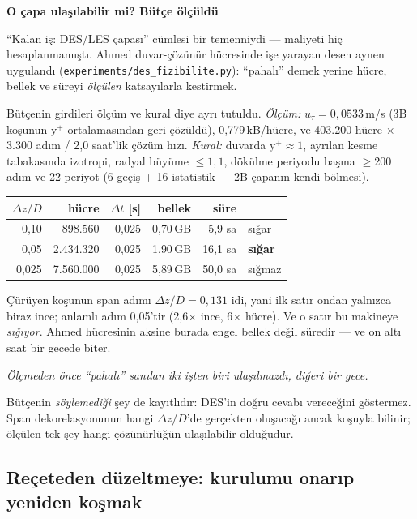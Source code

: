 \documentclass[11pt,a4paper]{article}
\newcommand{\kkkenar}{lacivert}
\newcommand{\kkzemin}{kod}
\newenvironment{renkkutu}[3]{%
  \renewcommand{\kkkenar}{#1}\renewcommand{\kkzemin}{#2}%
  \par\medskip\noindent
  \begin{lrbox}{\kutugovde}%
  \begin{minipage}{\dimexpr\linewidth-2\fboxsep-2\fboxrule\relax}\footnotesize
  \textcolor{#1}{\textbf{#3}}\par\vspace{3pt}%
}{%
  \end{minipage}%
  \end{lrbox}%
  \noindent\fcolorbox{\kkkenar}{\kkzemin}{\usebox{\kutugovde}}%
  \par\medskip
}
\newenvironment{olculdu}[1]{\begin{renkkutu}{iyi}{iyibg}{#1}}{\end{renkkutu}}
\begin{document}
\begin{olculdu}{O çapa ulaşılabilir mi? Bütçe ölçüldü}
``Kalan iş: DES/LES çapası'' cümlesi bir temenniydi --- maliyeti hiç
hesaplanmamıştı. Ahmed duvar-çözünür hücresinde işe yarayan desen aynen
uygulandı (\texttt{experiments/des\_fizibilite.py}): ``pahalı'' demek yerine
hücre, bellek ve süreyi \emph{ölçülen} katsayılarla kestirmek.

Bütçenin girdileri ölçüm ve kural diye ayrı tutuldu. \emph{Ölçüm:}
$u_\tau = 0{,}0533$\,m/s (3B koşunun y$^+$ ortalamasından geri çözüldü),
0{,}779\,kB/hücre, ve 403.200 hücre $\times$ 3.300 adım / 2{,}0 saat'lik
çözüm hızı. \emph{Kural:} duvarda y$^+{\approx}1$, ayrılan kesme tabakasında
izotropi, radyal büyüme $\le 1{,}1$, dökülme periyodu başına $\ge$200 adım ve
22 periyot (6 geçiş + 16 istatistik --- 2B çapanın kendi bölmesi).

\begin{center}\footnotesize
\begin{tabular}{@{}rrrrrl@{}}
\toprule
$\Delta z/D$ & \textbf{hücre} & $\Delta t$ [s] & \textbf{bellek} & \textbf{süre} & \\
\midrule
0{,}10  &   898.560 & 0{,}025 & 0{,}70\,GB &  5{,}9 sa & sığar \\
0{,}05  & 2.434.320 & 0{,}025 & 1{,}90\,GB & 16{,}1 sa & \textbf{sığar} \\
0{,}025 & 7.560.000 & 0{,}025 & 5{,}89\,GB & 50{,}0 sa & sığmaz \\
\bottomrule
\end{tabular}
\end{center}

\noindent Çürüyen koşunun span adımı $\Delta z/D = 0{,}131$ idi, yani ilk satır
ondan yalnızca biraz ince; anlamlı adım 0{,}05'tir (2{,}6$\times$ ince,
6$\times$ hücre). Ve o satır bu makineye \emph{sığıyor}. Ahmed hücresinin
aksine burada engel bellek değil süredir --- ve on altı saat bir gecede biter.

\begin{center}\itshape
Ölçmeden önce ``pahalı'' sanılan iki işten biri ulaşılmazdı, diğeri bir gece.
\end{center}

\noindent Bütçenin \emph{söylemediği} şey de kayıtlıdır: DES'in doğru cevabı
vereceğini göstermez. Span dekorelasyonunun hangi $\Delta z/D$'de gerçekten
oluşacağı ancak koşuyla bilinir; ölçülen tek şey hangi çözünürlüğün
ulaşılabilir olduğudur.
\end{olculdu}

\subsection{Reçeteden düzeltmeye: kurulumu onarıp yeniden koşmak}
\label{sec:duzeltici}
\end{document}

